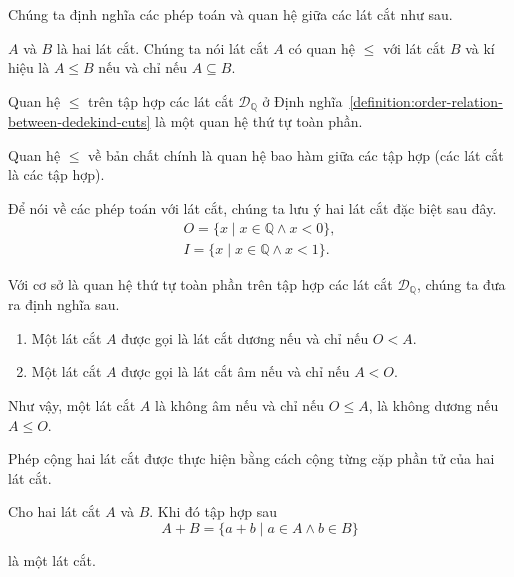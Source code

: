 Chúng ta định nghĩa các phép toán và quan hệ giữa các lát cắt như sau.

\begin{definition}\label{definition:order-relation-between-dedekind-cuts}
    $A$ và $B$ là hai lát cắt. Chúng ta nói lát cắt $A$ có quan hệ $\leq$ với lát cắt $B$ và kí hiệu là $A\leq B$ nếu và chỉ nếu $A\subseteq B$.
\end{definition}

\begin{theorem}
    Quan hệ $\leq$ trên tập hợp các lát cắt $\mathscr{D}_{\mathbb{Q}}$ ở Định nghĩa~\ref{definition:order-relation-between-dedekind-cuts} là một quan hệ thứ tự toàn phần.
\end{theorem}

Quan hệ $\leq$ về bản chất chính là quan hệ bao hàm giữa các tập hợp (các lát cắt là các tập hợp).

Để nói về các phép toán với lát cắt, chúng ta lưu ý hai lát cắt đặc biệt sau đây.
\[
    \begin{split}
        O = \{ x \mid x\in\mathbb{Q} \wedge x < 0 \}, \\
        I = \{ x \mid x\in\mathbb{Q} \wedge x < 1 \}.
    \end{split}
\]

Với cơ sở là quan hệ thứ tự toàn phần trên tập hợp các lát cắt $\mathscr{D}_{\mathbb{Q}}$, chúng ta đưa ra định nghĩa sau.
\begin{definition}
    \begin{enumerate}[label={(\roman*)}]
        \item Một lát cắt $A$ được gọi là lát cắt dương nếu và chỉ nếu $O < A$.
        \item Một lát cắt $A$ được gọi là lát cắt âm nếu và chỉ nếu $A < O$.
    \end{enumerate}
\end{definition}

Như vậy, một lát cắt $A$ là không âm nếu và chỉ nếu $O\leq A$, là không dương nếu $A\leq O$.

Phép cộng hai lát cắt được thực hiện bằng cách cộng từng cặp phần tử của hai lát cắt.
\begin{theorem}
    Cho hai lát cắt $A$ và $B$. Khi đó tập hợp sau
    \[
        A + B = \{ a + b \mid a\in A\wedge b\in B \}
    \]

    là một lát cắt.
\end{theorem}

